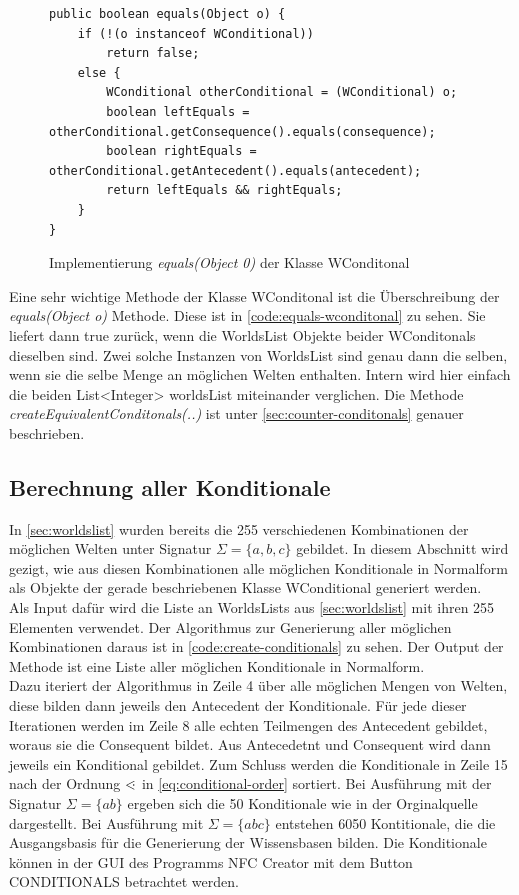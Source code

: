 \documentclass[12pt,a4paper]{article}
\newcommand\dotl{\mathrel{%
    \mathchoice{\QEQ}{\QEQ}{\QEQ}{\QEQ}%
}}
\def\QEQ{{%
    \setbox0\hbox{<}%
    \rlap{\hbox to \wd0{\hss \raisebox {0.1pt}{$\ \cdot$\hss}}}\box0
}}
\begin{document}
\begin{figure}
\begin{lstlisting}
public boolean equals(Object o) {
    if (!(o instanceof WConditional))
        return false;
    else {
        WConditional otherConditional = (WConditional) o;
        boolean leftEquals = otherConditional.getConsequence().equals(consequence);
        boolean rightEquals = otherConditional.getAntecedent().equals(antecedent);
        return leftEquals && rightEquals;
    }
}
\end{lstlisting}
\caption{Implementierung \textit{equals(Object 0)} der Klasse WConditonal}
\label{code:equals-wconditonal}
\end{figure}


Eine sehr wichtige Methode der Klasse WConditonal ist die Überschreibung der \textit{equals(Object o)} Methode. Diese ist in \autoref{code:equals-wconditonal} zu sehen. Sie liefert dann true zurück, wenn die WorldsList Objekte beider WConditonals dieselben sind. Zwei solche Instanzen von WorldsList sind genau dann die selben, wenn sie die selbe Menge an möglichen Welten enthalten. Intern wird hier einfach die beiden List<Integer> worldsList miteinander verglichen. Die Methode \textit{createEquivalentConditonals(..)} ist unter \autoref{sec:counter-conditonals} genauer beschrieben.


\subsection{Berechnung aller Konditionale}




In \autoref{sec:worldslist} wurden bereits die 255 verschiedenen Kombinationen der möglichen Welten unter Signatur $\Sigma=\{a,b,c\}$ gebildet. In diesem Abschnitt wird gezigt, wie aus diesen Kombinationen alle möglichen Konditionale in Normalform als Objekte der gerade beschriebenen Klasse WConditional generiert werden. \\
Als Input dafür wird die Liste an WorldsLists aus \autoref{sec:worldslist} mit ihren 255 Elementen verwendet. Der Algorithmus zur Generierung aller möglichen Kombinationen daraus ist in \autoref{code:create-conditionals} zu sehen. Der Output der Methode ist eine Liste aller möglichen Konditionale in Normalform. \\
Dazu iteriert der Algorithmus in Zeile 4 über alle möglichen Mengen von Welten, diese bilden dann jeweils den Antecedent der Konditionale. Für jede dieser Iterationen werden im Zeile 8 alle echten Teilmengen des Antecedent gebildet, woraus sie die Consequent bildet. Aus Antecedetnt und Consequent wird dann jeweils ein Konditional gebildet. Zum Schluss werden die Konditionale in Zeile 15 nach der Ordnung $\dotl$ in \autoref{eq:conditional-order} sortiert. Bei Ausführung mit der Signatur $\Sigma=\{ab\}$ ergeben sich die 50 Konditionale wie in der Orginalquelle \cite{beierle19} dargestellt. Bei Ausführung mit $\Sigma=\{abc\}$ entstehen 6050 Kontitionale, die die Ausgangsbasis für die Generierung der Wissensbasen bilden. Die Konditionale können in der GUI des Programms NFC Creator mit dem Button CONDITIONALS betrachtet werden.
\end{document}
